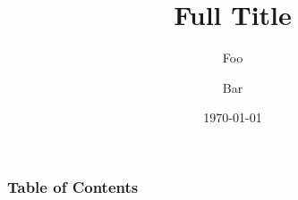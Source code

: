 \documentclass{fatslides}
\title[Short Title]{Full Title}
\author[Short Author]{Foo \and Bar}
\date[\today]{\today}
\begin{document}
\frame{\titlepage}

\begin{frame}
    \frametitle{Table of Contents}
    \tableofcontents
\end{frame}






\end{document}
